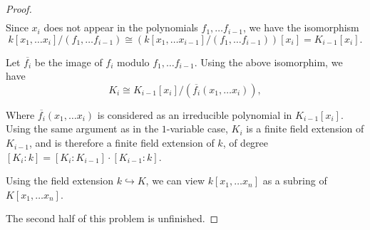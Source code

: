 \documentclass[12pt]{article}
\theoremstyle{definition}
\newenvironment{problem}[2][Problem]{\begin{trivlist}
\item[\hskip \labelsep {\bfseries #1}\hskip \labelsep {\bfseries #2.}]}{\end{trivlist}}
\begin{document}
\begin{problem}{1}
\begin{proof}
\begin{align*}
		\end{align*}
		Since $x_i$ does not appear in the polynomials $f_1, \dots f_{i-1}$, we have the isomorphism \[k[x_1, \dots x_i]/ (f_1, \dots f_{i-1}) \cong (k[x_1, \dots x_{i-1}]/(f_1, \dots f_{i-1}))[x_i] = K_{i-1}[x_i].\] 
		\par Let $\overline{f_i} $ be the image of $f_i$ modulo $f_1, \dots f_{i-1}$. Using the above isomorphim, we have 
		\[K_i \cong K_{i-1}[x_i]/(\overline{f_i}(x_1, \dots x_i)),\]
		\par Where $\overline{f_i}(x_1, \dots x_i)$ is considered as an irreducible polynomial in $K_{i-1}[x_i]$. Using the same argument as in the $1$-variable case, $K_i$ is a finite field extension of $K_{i-1}$, and is therefore a finite field extension of $k$, of degree $[K_i : k] = [K_i : K_{i-1}] \cdot [K_{i-1} : k]$.
		\par Using the field extension $k \hookrightarrow K$, we can view $k[x_1, \dots x_n]$ as a subring of $K[x_1, \dots x_n]$. 
		\par \; 
		\par The second half of this problem is unfinished.
		\par \;
	\end{proof}
\end{problem}
\end{document}
